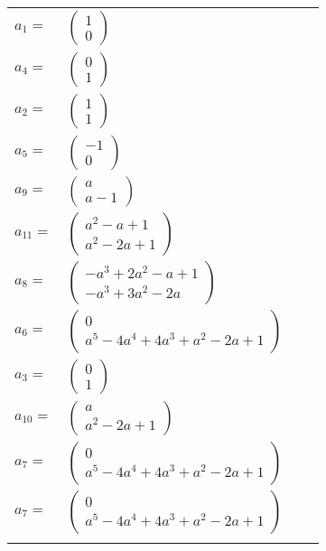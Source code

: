 \documentclass[1p]{elsarticle_modified}
\theoremstyle{definition}
\begin{document}
\begin{tabular}{m{7pt} m{180pt} m{7pt} m{180pt} }
\flushright $a_{1}=$&$\begin{pmatrix}1\\0\end{pmatrix}$ \\
\flushright $a_{4}=$&$\begin{pmatrix}0\\1\end{pmatrix}$ \\
\flushright $a_{2}=$&$\begin{pmatrix}1\\1\end{pmatrix}$ \\
\flushright $a_{5}=$&$\begin{pmatrix}-1\\0\end{pmatrix}$ \\
\flushright $a_{9}=$&$\begin{pmatrix}a\\a-1\end{pmatrix}$ \\
\flushright $a_{11}=$&$\begin{pmatrix}a^2- a+1\\a^2-2 a+1\end{pmatrix}$ \\
\flushright $a_{8}=$&$\begin{pmatrix}- a^3+2 a^2- a+1\\- a^3+3 a^2-2 a\end{pmatrix}$ \\
\flushright $a_{6}=$&$\begin{pmatrix}0\\a^5-4 a^4+4 a^3+a^2-2 a+1\end{pmatrix}$ \\
\flushright $a_{3}=$&$\begin{pmatrix}0\\1\end{pmatrix}$ \\
\flushright $a_{10}=$&$\begin{pmatrix}a\\a^2-2 a+1\end{pmatrix}$ \\
\flushright $a_{7}=$&$\begin{pmatrix}0\\a^5-4 a^4+4 a^3+a^2-2 a+1\end{pmatrix}$\\ \flushright $a_{7}=$&$\begin{pmatrix}0\\a^5-4 a^4+4 a^3+a^2-2 a+1\end{pmatrix}$\\&\end{tabular}
\end{document}

